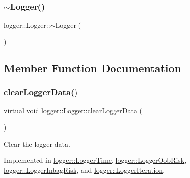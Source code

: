 \subsubsection{\texorpdfstring{$\sim$\+Logger()}{~Logger()}}
{\footnotesize\ttfamily logger\+::\+Logger\+::$\sim$\+Logger (\begin{DoxyParamCaption}{ }\end{DoxyParamCaption})\hspace{0.3cm}{\ttfamily [virtual]}}



\subsection{Member Function Documentation}
\mbox{\label{classlogger_1_1_logger_a8c68db2430fa84b67528bfa6ae45a516}} 
\subsubsection{\texorpdfstring{clear\+Logger\+Data()}{clearLoggerData()}}
{\footnotesize\ttfamily virtual void logger\+::\+Logger\+::clear\+Logger\+Data (\begin{DoxyParamCaption}{ }\end{DoxyParamCaption})\hspace{0.3cm}{\ttfamily [pure virtual]}}



Clear the logger data. 



Implemented in \mbox{\hyperlink{classlogger_1_1_logger_time_a0bcce74556cf50de86b8d7333d82e919}{logger\+::\+Logger\+Time}}, \mbox{\hyperlink{classlogger_1_1_logger_oob_risk_a8330dd8fd748c8ea1e0027f1b2c7ea50}{logger\+::\+Logger\+Oob\+Risk}}, \mbox{\hyperlink{classlogger_1_1_logger_inbag_risk_ad5428486e370ae88e3bcb3a6c18d0f44}{logger\+::\+Logger\+Inbag\+Risk}}, and \mbox{\hyperlink{classlogger_1_1_logger_iteration_ac7c2aace3ba5f22d8f42ec078fe62602}{logger\+::\+Logger\+Iteration}}.

\mbox{\label{classlogger_1_1_logger_ae39cfa15ba833840ae52889c09cac994}} 
